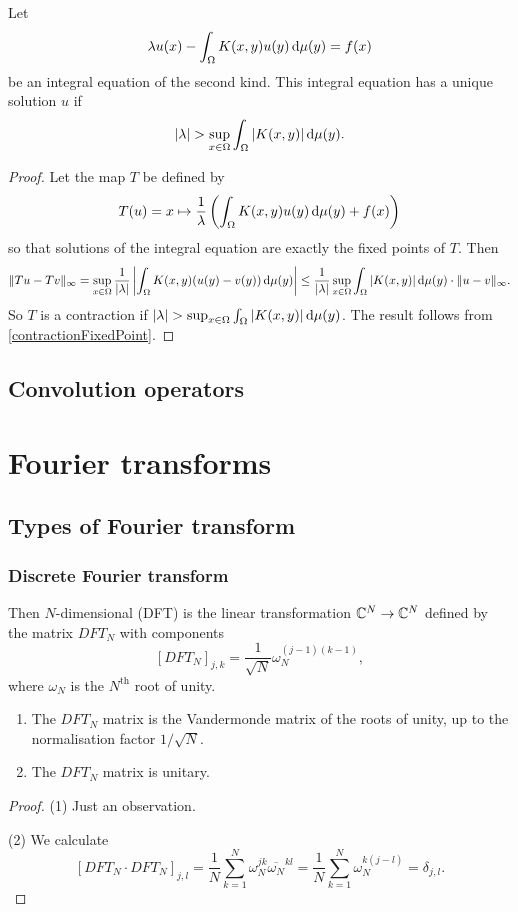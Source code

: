 \begin{proposition}
Let
\[ \lambda u(x) - \int_\Omega K(x,y)u(y)\operatorname{d \!}{\mu(y)} = f(x)\]
be an integral equation of the second kind. This integral equation has a unique solution $u$ if
\[ |\lambda| > \sup_{x\in \Omega} \int_{\Omega}|K(x,y)|\operatorname{d \!}{\mu(y)}. \]
\end{proposition}
\begin{proof}
Let the map $T$ be defined by
\[ T(u) = x\mapsto \frac{1}{\lambda}\left(\int_\Omega K(x,y)u(y)\operatorname{d \!}{\mu(y)} + f(x)\right) \]
so that solutions of the integral equation are exactly the fixed points of $T$. Then
\[ \lVert Tu-Tv\rVert_\infty = \sup_{x\in\Omega} \frac{1}{|\lambda|} \left|\int_\Omega K(x,y)(u(y)- v(y))\operatorname{d \!}{\mu(y)}\right| \leq \frac{1}{|\lambda|} \sup_{x\in \Omega} \int_{\Omega}|K(x,y)|\operatorname{d \!}{\mu(y)} \cdot \lVert u-v\rVert_\infty. \]
So $T$ is a contraction if $|\lambda| > \sup_{x\in \Omega} \int_{\Omega}|K(x,y)|\operatorname{d \!}{\mu(y)}$. The result follows from \ref{contractionFixedPoint}.
\end{proof}

\section{Convolution operators}





\chapter{Fourier transforms}

\section{Types of Fourier transform}

\subsection{Discrete Fourier transform}
\begin{definition}
Then $N$-dimensional  (DFT) is the linear transformation $\mathbb{C}^N \to \mathbb{C}^N$ defined by the matrix $DFT_N$ with components
\[ [DFT_N]_{j,k} = \frac{1}{\sqrt{N}}\omega_N^{(j-1)(k-1)}, \]
where $\omega_N$ is the $N^\text{th}$ root of unity.
\end{definition}

\begin{lemma} \mbox{}
\begin{enumerate}
\item The $DFT_N$ matrix is the Vandermonde matrix of the roots of unity, up to the normalisation factor $1/\sqrt{N}$.
\item The $DFT_N$ matrix is unitary.
\end{enumerate}
\end{lemma}
\begin{proof}
(1) Just an observation.

(2) We calculate
\[ [DFT_N\cdot DFT_N]_{j,l} = \frac{1}{N}\sum_{k=1}^N\omega_N^{jk}\overline{\omega_N}^{kl} = \frac{1}{N}\sum_{k=1}^N\omega_N^{k(j-l)} = \delta_{j,l}. \]
\end{proof}
